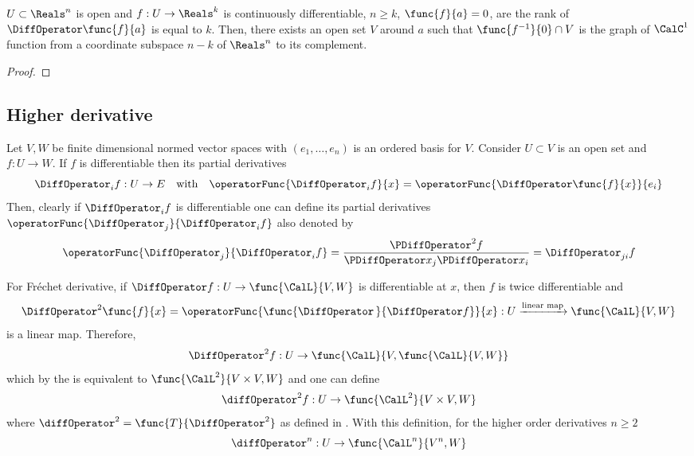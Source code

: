 \begin{corollary}
    \(U \subset \Reals^n\) is open and \(f : U \to \Reals^k\) is continuously differentiable, \(n \geq k\), \(\func{f}{a} = 0\), are the rank of \(\DiffOperator \func{f}{a}\) is equal to \(k\). Then, there exists an open set \(V\) around \(a\) such that \(\func{f^{-1}}{0} \cap V\) is the graph of \(\CalC^1\) function from a coordinate subspace \(n - k\) of \(\Reals^n\) to its complement.
\end{corollary}

\begin{proof}

\end{proof}

\subsection{Higher derivative}
Let \(V,W\) be finite dimensional normed vector spaces with \((e_1, \dots , e_n)\) is an ordered basis for \(V\). Consider \(U \subset V\) is an open set and \(f: U \to W\). If \(f\) is differentiable then its partial derivatives
\begin{equation*}
    \DiffOperator_i f: U \to E \quad \text{with} \quad \operatorFunc{\DiffOperator_i f}{x} = \operatorFunc{\DiffOperator \func{f}{x}}{e_i}
\end{equation*}
Then, clearly if \(\DiffOperator_i f\) is differentiable one can define its partial derivatives \(\operatorFunc{\DiffOperator_j}{\DiffOperator_i f}\) also denoted by
\begin{equation*}
    \operatorFunc{\DiffOperator_j}{\DiffOperator_i f}=  \dfrac{\PDiffOperator^2 f}{\PDiffOperator x_j \PDiffOperator x_i} =\DiffOperator_{ji} f
\end{equation*}

For Fr\'{e}chet derivative, if \(\DiffOperator f: U \to \func{\CalL}{V,W}\) is differentiable at \(x\), then \(f\) is twice differentiable and
\begin{equation*}
    \DiffOperator^2 \func{f}{x} = \operatorFunc{\func{\DiffOperator \,}{\DiffOperator f}}{x} : U \xrightarrow{\text{linear map}} \func{\CalL}{V,W}
\end{equation*}
is a linear map. Therefore,
\begin{equation*}
    \DiffOperator^2 f :  U \to \func{\CalL}{V,\func{\CalL}{V,W}}
\end{equation*}
which by the  is equivalent to \(\func{\CalL^2}{V \times V, W}\) and one can define
\begin{equation*}
    \diffOperator^2 f : U  \to \func{\CalL^2}{V \times V, W}
\end{equation*}
where \(\diffOperator^2 = \func{T}{\DiffOperator^2}\) as defined in . With this definition, for the higher order derivatives \(n \geq 2\)
\begin{equation*}
    \diffOperator^n : U \to \func{\CalL^n}{V^n, W}
\end{equation*}

